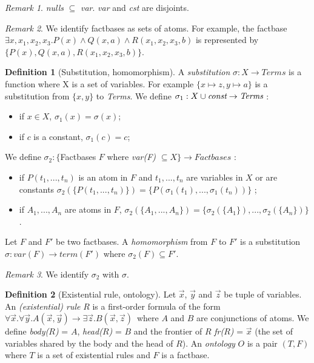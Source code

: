 \documentclass{article}
\theoremstyle{definition}
\newtheorem{definition}{Definition}[section]
\theoremstyle{remark}
\newtheorem{remark}{Remark}[section]
\begin{document}
\begin{remark} 
\emph{nulls} $\subseteq$ \emph{var}. \emph{var} and \emph{cst} are disjoints.
\end{remark}

\begin{remark} We identify factbases as sets of atoms. For example, the factbase $\exists x,x_{1},x_{2},x_{3}. P(x) \land Q(x,a) \land R(x_{1},x_{2},x_{3},b)$ is represented by
$\{P(x),Q(x,a),R(x_{1},x_{2},x_{3},b)\}$.
\end{remark}

\begin{definition}[Substitution, homomorphism]
A \emph{substitution} $\sigma:X \to \textit{Terms}$ is a function where X is a set of variables. For example $\{x \mapsto z, y \mapsto a \}$ is a substitution from $\{x,y\}$ to \textit{Terms}. We define $\sigma_1:X \cup \emph{const} \to \textit{Terms}$ :
\begin{itemize}
\item if $x \in X$, $\sigma_1(x) = \sigma(x)$;
\item if $c$ is a constant, $\sigma_1(c) = c$;
\end{itemize}
We define $\sigma_2:\{$Factbases $F$ where \emph{var(F)} $\subseteq X\} \to \textit{Factbases}$ :
\begin{itemize}
\item if $P(t_{1},...,t_{n})$ is an atom in $F$ and $t_1,...,t_n$ are variables in $X$ or are constants $\sigma_2(\{P(t_{1},...,t_{n})\}) = \{P(\sigma_1(t_{1}),...,\sigma_1(t_{n}))\}$ ;
\item if $A_{1},...,A_{n}$ are atoms in $F$, $\sigma_2(\{A_{1},...,A_{n}\}) = \{\sigma_2(\{A_{1}\}),...,\sigma_2(\{A_{n}\})\}$.
\end{itemize}
Let $F$ and $F'$ be two factbases. A \emph{homomorphism} from $F$ to $F'$ is a substitution $\sigma:var(F) \to term(F')$ where $\sigma_2(F) \subseteq F'$. 
\end{definition}

\begin{remark}
We identify $\sigma_2$ with $\sigma$.
\end{remark}

\begin{definition}[Existential rule, ontology]
Let $\vec x$, $\vec y$ and $\vec z$ be tuple of variables. An \emph{(existential) rule} $R$ is a first-order formula	 of the form  $\forall \vec x.\forall \vec y. A(\vec x,\vec y) \rightarrow \exists \vec z. B(\vec x,\vec z)$\ where  $A$ and $B$ are conjunctions of atoms. We define \emph{body($R$)} = $A$, \emph{head($R$)} = $B$ and the frontier of $R$ \emph{fr($R$)} = $\vec x$ (the set of variables shared by the body and the head of $R$). An \emph{ontology} $O$ is a pair $(T,F)$ where $T$ is a set of existential rules and $F$ is a factbase.
\end{definition}
\end{document}
